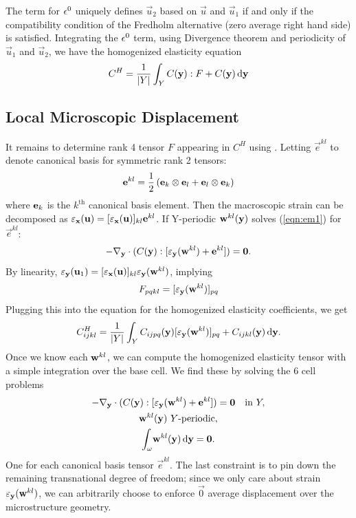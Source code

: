 \documentclass[twocolumn,10pt]{article}
\begin{document}
The term for $\e^0$ uniquely defines $\vec{u}_2$ based on $\vec{u}$
and $\vec{u}_1$ if and only if the compatibility condition of the
Fredholm alternative (zero average right hand side) is
satisfied. Integrating the $\e^0$ term, using Divergence theorem and
periodicity of $\vec{u}_1$ and $\vec{u}_2$, we have the homogenized
elasticity equation
\begin{equation}
  C^H = \frac{1}{|Y|} \int_Y C(\y) : F + C(\y) \, \mathrm{d} {\y}
\end{equation}

\subsection{Local Microscopic Displacement}
It remains to determine rank 4 tensor $F$ appearing in $C^H$ using
. Letting $\vec{e}^{kl}$ to denote canonical basis for
symmetric rank 2 tensors:
\[
\vec{e}^{kl} = \frac{1}{2} \left({\bf e}_k \otimes {\bf e}_l + {\bf
  e}_l \otimes {\bf e}_k \right)
\]
where ${\bf e}_k$ is the $k^\text{th}$ canonical basis element. Then
the macroscopic strain can be decomposed as $\strain_{\x}({\bf u}) =
[\strain_{\x}({\bf u})]_{kl}\vec{e}^{kl}$. If Y-periodic ${\bf
  w}^{kl}({\y})$ solves (\ref{eqn:em1}) for $\vec{e}^{kl}$:
\begin{equation}
-\nabla_{\y} \cdot (C(\y): [\strain_\y({\bf w}^{kl}) +
  \vec{e}^{kl}]) = \vec{0}.
\end{equation}
By linearity, $\strain_\y(\u_1) =
[\strain_\x(\u)]_{kl}\strain_\y(\vec{w}^{kl})$, implying
\begin{equation}
F_{pqkl} = [\strain_{\y}({\bf w}^{kl})]_{pq}
\end{equation}
Plugging this into the equation for the homogenized elasticity
coefficients, we get
\begin{equation}
    \label{eqn:Eh}
    C^H_{ijkl}= \frac{1}{|Y|} \int_Y C_{ijpq}({\y}) [\strain_{\y}({\bf
        w}^{kl})]_{pq} + C_{ijkl}({\y}) \, \mathrm{d} {\y}.
\end{equation}
Once we know each ${\bf w}^{kl}$, we can compute the homogenized
elasticity tensor with a simple integration over the base cell. We
find these by solving the 6 cell problems
\begin{subequations}
  \begin{gather}
    -\nabla_{\y} \cdot (C(\y):[\strain_\y(\vec{w}^{kl}) + \vec{e}^{kl}]) = \vec{0} \quad \text{in } Y, \\
    \vec{w}^{kl}(\y)\ Y \text{-periodic}, \\
    \int_\omega \! \vec{w}^{kl}(\y) \, \mathrm{d} {\y} =  \vec{0}.
  \end{gather}
\end{subequations}
One for each canonical basis tensor $\vec{e}^{kl}$. The last
constraint is to pin down the remaining transnational degree of
freedom; since we only care about strain $\strain_{\y}({\bf w}^{kl})$,
we can arbitrarily choose to enforce $\vec{0}$ average displacement
over the microstructure geometry.



\end{document}
